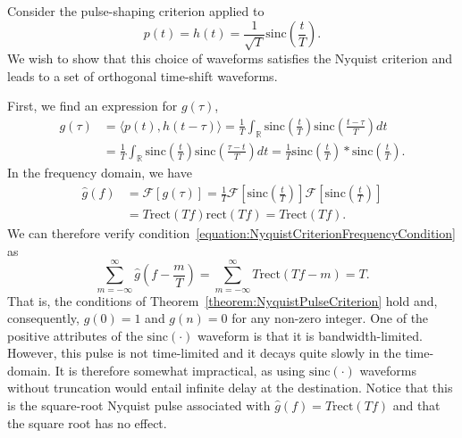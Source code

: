 \begin{example}
Consider the pulse-shaping criterion applied to
\begin{equation*}
p(t) = h (t) = \frac{1}{\sqrt{T}} \mathrm{sinc} \left( \frac{t}{T} \right) .
\end{equation*}
We wish to show that this choice of waveforms satisfies the Nyquist criterion and leads to a set of orthogonal time-shift waveforms.

First, we find an expression for $g(\tau)$,
\begin{equation*}
\begin{split}
g(\tau) &= \langle p(t), h (t-\tau) \rangle
= \frac{1}{T} \int_{\mathbb{R}} \mathrm{sinc} \left( \frac{t}{T} \right)
\mathrm{sinc} \left( \frac{t - \tau}{T} \right) dt \\
&= \frac{1}{T} \int_{\mathbb{R}} \mathrm{sinc} \left( \frac{t}{T} \right)
\mathrm{sinc} \left( \frac{\tau - t}{T} \right) dt
= \frac{1}{T} \mathrm{sinc} \left( \frac{t}{T} \right)
\ast \mathrm{sinc} \left( \frac{t}{T} \right) .
\end{split}
\end{equation*}
In the frequency domain, we have
\begin{equation*}
\begin{split}
\hat{g}(f) &= \mathcal{F} \left[ g(\tau) \right]
= \frac{1}{T} \mathcal{F} \left[ \mathrm{sinc} \left( \frac{t}{T} \right) \right]
\mathcal{F} \left[ \mathrm{sinc} \left( \frac{t}{T} \right) \right] \\
&= T \mathrm{rect} (T f) \mathrm{rect} (T f)
= T \mathrm{rect} (T f) .
\end{split}
\end{equation*}
We can therefore verify condition~\eqref{equation:NyquistCriterionFrequencyCondition} as
\begin{equation*}
\sum_{m = -\infty}^{\infty}
\hat{g} \left( f - \frac{m}{T} \right)
= \sum_{m = - \infty}^{\infty} T \mathrm{rect} (Tf - m)
= T .
\end{equation*}
That is, the conditions of Theorem~\ref{theorem:NyquistPulseCriterion} hold and, consequently, $g(0) = 1$ and $g(n) = 0$ for any non-zero integer.
One of the positive attributes of the $\mathrm{sinc} (\cdot)$ waveform is that it is bandwidth-limited.
However, this pulse is not time-limited and it decays quite slowly in the time-domain.
It is therefore somewhat impractical, as using $\mathrm{sinc} (\cdot)$ waveforms without truncation would entail infinite delay at the destination.
Notice that this is the square-root Nyquist pulse associated with $\hat{g}(f)=T \mathrm{rect}(Tf)$ and that the square root has no effect.
\end{example}

